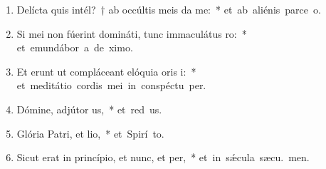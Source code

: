 \begin{flushleft}
\begin{enumerate}[leftmargin=*]
\item Delícta quis intél?~† ab occúltis meis da me:~* \mbox{et ab aliénis parce  o.}

\item Si mei non fúerint domináti, tunc immaculátus ro:~* \mbox{et emundábor a de ximo.}

\item Et erunt ut compláceant elóquia oris i:~* \mbox{et meditátio cordis mei in conspéctu  per.}

\item Dómine, adjútor us,~* \mbox{et red us.}

\item Glória Patri, et lio,~* \mbox{et Spirí to.}

\item Sicut erat in princípio, et nunc, et per,~* \mbox{et in sǽcula sæcu. men.}

\end{enumerate}
\end{flushleft}